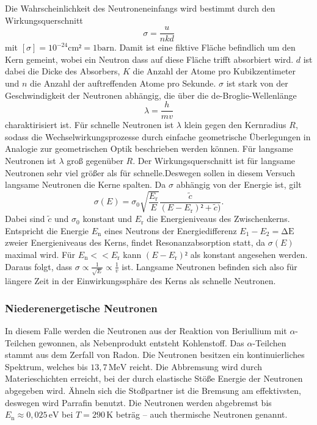 Die Wahrscheinlichkeit des Neutroneneinfangs wird bestimmt durch den Wirkungsquerschnitt
\begin{equation}
\sigma=\frac{u}{nkd}
\end{equation}
mit $[\sigma]= 10^{-24}\si{\centi\meter}²= 1\text{barn}$. Damit ist eine fiktive Fläche befindlich um den Kern gemeint, wobei ein Neutron dass auf diese Fläche trifft absorbiert wird. $d$ ist dabei die Dicke des Absorbers, $K$ die Anzahl der Atome pro Kubikzentimeter und $n$ die Anzahl der auftreffenden Atome pro Sekunde.
$\sigma$ ist stark von der Geschwindigkeit der Neutronen abhängig, die über die de-Broglie-Wellenlänge
\begin{equation}
\lambda=\frac{h}{mv}
\end{equation}
charaktirisiert ist. Für schnelle Neutronen ist $\lambda$ klein gegen den Kernradius $R$, sodass die Wechselwirkungsprozesse durch einfache geometrische Überlegungen in Analogie zur geometrischen Optik beschrieben werden können. Für langsame Neutronen ist $\lambda$ groß gegenüber $R$. Der Wirkungsquerschnitt ist für langsame Neutronen sehr viel größer als für schnelle.Deswegen sollen in diesem Versuch langsame Neutronen die Kerne spalten.
Da $\sigma$ abhängig von der Energie ist, gilt
\begin{equation}
\sigma(E)=\sigma_0\sqrt{\frac{E_\mathup{r}}{E}}\frac{\tilde{c}}{(E-E_\mathup{r})²+\tilde{c})}.
\end{equation}
Dabei sind $\tilde{c}$ und $\sigma_0$ konstant und $E_\mathup{r}$ die Energieniveaus des Zwischenkerns.
 Entspricht die Energie $E_\mathup{n}$ eines Neutrons der Energiedifferenz $E_\mathup{1}-E_2=\mathup{\Delta{E}}$ zweier Energieniveaus des Kerns, findet Resonanzabsorption statt, da $\sigma(E)$ maximal wird. Für $E_\mathup{n}<<E_\mathup{r}$ kann $(E-E_\mathup{r})²$ als konstant angesehen werden. Daraus folgt, dass $\sigma\propto \frac{1}{\sqrt{E}}\propto\frac{1}{v}$ ist. Langsame Neutronen befinden sich also für längere Zeit in der Einwirkungssphäre des Kerns als schnelle Neutronen.

\subsubsection{Niederenergetische Neutronen}
In diesem Falle werden die Neutronen aus der Reaktion von Beriullium mit $\alpha$-Teilchen gewonnen, als Nebenprodukt entsteht Kohlenstoff. Das $\alpha$-Teilchen stammt aus dem Zerfall von Radon.
Die Neutronen besitzen ein kontinuierliches Spektrum, welches bis $13,7\,\si\mega \mathup{e}\si\volt$ reicht. Die Abbremsung wird durch Materieschichten erreicht, bei der durch elastische Stöße Energie der Neutronen abgegeben wird. Ähneln sich die Stoßpartner ist die Bremsung am effektivsten, deswegen wird Parrafin benutzt. Die Neutronen werden abgebremst bis $E_\mathup{n}\approx 0,025\,\text{e}\si\volt$ bei $T=290\,\si\kelvin$ beträg -- auch thermische Neutronen genannt.
